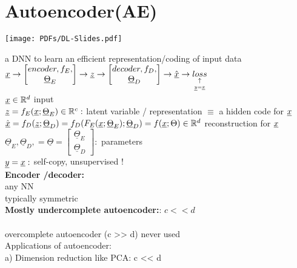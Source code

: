 \section{Autoencoder(AE)}
\texttt{[image: PDFs/DL-Slides.pdf]}

a DNN to learn an efficient representation/coding of input data\\
$ {\underline x} \rightarrow  \left[\begin{matrix}
encoder, f_E , \\
\underline{\Theta}_E
\end{matrix} \right] \rightarrow {\underline z} \rightarrow \left[ \begin{matrix}
decoder, f_D ,\\
 \underline{\Theta}_D
\end{matrix}\right] \rightarrow \hat{{\underline x}} \rightarrow \underset{\underset{{\underline y} = {\underline x}}{\uparrow} }{loss}$\\
$  {\underline x} \in \mathbb R ^d  $ input \\
$  {\underline z} = f_E ({\underline x} ; \underline{\Theta}_E) \in \mathbb R^c : $ latent variable / representation $  \equiv  $ a hidden code for $ {\underline x}  $\\
 $ \hat{{\underline x}} = f_D ({\underline z} ; \underline{\Theta}_D )= f_D (F_E ({\underline x} ; \underline{\Theta}_E ) ; \underline{\Theta}_D )  = f({\underline x} ; \Theta ) \in \mathbb R ^d  $ reconstruction for $  {\underline x}  $\\
 $  \underline{\Theta} _E ,   \underline{\Theta} _D , = \underline{\Theta} = \left[ \begin{matrix}
 \underline{\Theta} _E \\
 \underline{\Theta} _D 
 \end{matrix}  \right] : $ parameters \\
 $  {\underline y} = {\underline x}:  $ self-copy, unsupervised ! \\
\textbf{ Encoder /decoder:}\\
\textbullet any NN \\
\textbullet typically symmetric \\
\textbf{Mostly undercomplete autoencoder:}: $ c << d  $\\
 \\
overcomplete autoencoder (c >> d) never used \\
Applications of autoencoder:\\
\textbullet a) Dimension reduction like PCA: c << d \\
